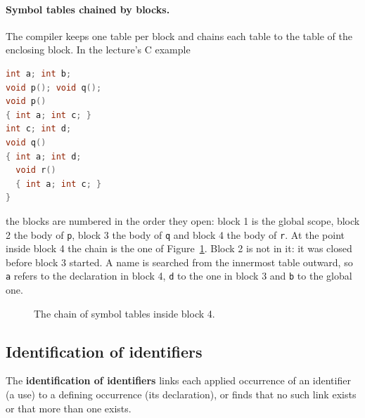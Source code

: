 \paragraph{Symbol tables chained by blocks.} The compiler keeps one table per
block and chains each table to the table of the enclosing block. In the
lecture's C example
\begin{lstlisting}[language=C]
int a; int b;
void p(); void q();
void p()
{ int a; int c; }
int c; int d;
void q()
{ int a; int d;
  void r()
  { int a; int c; }
}
\end{lstlisting}
the blocks are numbered in the order they open: block 1 is the global scope,
block 2 the body of \texttt{p}, block 3 the body of \texttt{q} and block 4 the
body of \texttt{r}. At the point inside block 4 the chain is the one of Figure~\ref{fig:chain}.
Block 2 is not in it: it was closed before block 3 started. A name is
searched from the innermost table outward, so \texttt{a} refers to the
declaration in block 4, \texttt{d} to the one in block 3 and \texttt{b} to
the global one.

\begin{figure}[h]
\centering
{}
\caption{The chain of symbol tables inside block 4.}
\label{fig:chain}
\end{figure}

\subsection{Identification of identifiers}

\begin{definition}
The \textbf{identification of identifiers} links each applied occurrence of
an identifier (a use) to a defining occurrence (its declaration), or finds
that no such link exists or that more than one exists.
\end{definition}

